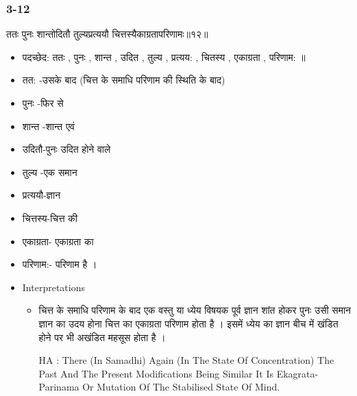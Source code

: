 \begin{frame}[fragile]\frametitle{3-12}
\begin{sanskrit}
ततः पुनः शान्तोदितौ तुल्यप्रत्ययौ चित्तस्यैकाग्रतापरिणामः॥१२॥
\end{sanskrit}

	\begin{itemize}
	\item पदच्छेद: ततः , पुनः , शान्त , उदित , तुल्य , प्रत्यय: , चितस्य , एकाग्रता , परिणाम: ॥
	\item तत: -उसके बाद (चित्त के समाधि परिणाम की स्थिति के बाद)
	\item पुनः -फिर से
	\item शान्त -शान्त एवं
	\item उदितौ-पुनः उदित होने वाले
	\item तुल्य -एक समान
	\item प्रत्ययौ-ज्ञान
	\item चित्तस्य-चित्त की
	\item एकाग्रता- एकाग्रता का
	\item परिणाम:- परिणाम है ।	
	\item Interpretations
		\begin{itemize}	
		\item चित्त के समाधि परिणाम के बाद एक वस्तु या ध्येय विषयक पूर्व ज्ञान शांत होकर पुनः उसी समान ज्ञान का उदय होना चित्त का एकाग्रता परिणाम होता है । इसमें ध्येय का ज्ञान बीच में खंडित होने पर भी अखंडित महसूस होता है ।
		\item [HA]: There (In Samadhi) Again (In The State Of Concentration) The Past And The Present Modifications Being Similar It Is Ekagrata-Parinama Or Mutation Of The Stabilised State Of Mind.
		\end{itemize}
	\end{itemize}
\end{frame}

